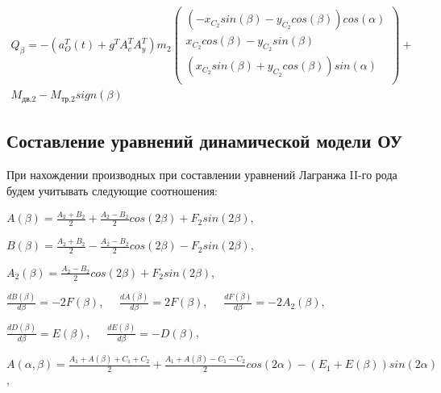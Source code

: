 \begin{equation} %
\label{eq:p3:41}
\begin{multlined}
Q_{ \beta }=- \left( a_{O}^{T} \left( t \right) +g^{T}A_{c}^{T}A_{y}^{T} \right) m_{2} \left( \begin{matrix}
\left( -x_{C_{2}}sin \left( \beta \right) -y_{C_{2}}cos \left( \beta \right) \right) cos \left( \alpha \right) \\
x_{C_{2}}cos \left( \beta \right) -y_{C_{2}}sin \left( \beta \right) \\
\left( x_{C_{2}}sin \left( \beta \right) +y_{C_{2}}cos \left( \beta \right) \right) sin \left( \alpha \right) \\
\end{matrix}
\right) + \\
M_{\textit{дв.2}}-M_{\textit{тр.2}}sign \left( \beta \right) 
\end{multlined}
\end{equation}

\newpage

\subsection{Составление уравнений динамической модели ОУ} \label{sec:ch3/sec8}

При нахождении производных при составлении уравнений Лагранжа II-го рода будем учитывать следующие соотношения:


\( A \left( \beta \right) =\frac{A_{2}+B_{2}}{2}+\frac{A_{2}-B_{2}}{2}cos \left( 2 \beta \right) +F_{2}sin \left( 2 \beta \right) \), 

\( B \left( \beta \right) =\frac{A_{2}+B_{2}}{2}-\frac{A_{2}-B_{2}}{2}cos \left( 2 \beta \right) -F_{2}sin \left( 2 \beta \right) \), 

\( A_{2} \left( \beta \right) =\frac{A_{2}-B_{2}}{2}cos \left( 2 \beta \right) +F_{2}sin \left( 2 \beta \right) \), 

\( \frac{dB \left( \beta \right) }{d \beta }=-2F \left( \beta \right) \),\ \ \ \( \frac{dA \left( \beta \right) }{d \beta }=2F \left( \beta \right) \),\ \ \ \( \frac{dF \left( \beta \right) }{d \beta }=-2A_{2} \left( \beta \right) \), 

\( \frac{dD \left( \beta \right) }{d \beta }=E \left( \beta \right) \),\ \ \ \( \frac{dE \left( \beta \right) }{d \beta }=-D \left( \beta \right) \), 

\( 
A \left( \alpha, \beta \right) =
\frac{A_{1}+A \left( \beta \right) +C_{1}+C_{2}}{2}+\frac{A_{1}+A \left( \beta \right) -C_{1}-C_{2}}{2}cos \left( 2 \alpha \right) - \left( E_{1}+E \left( \beta \right) \right) sin \left( 2 \alpha \right) \), 

